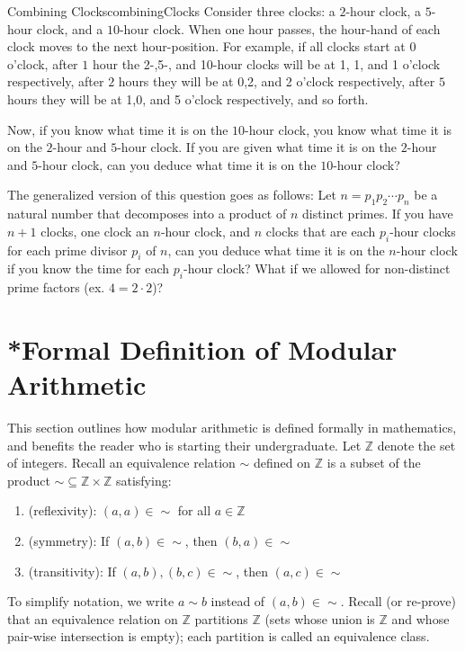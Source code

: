 \documentclass{article}
\newcommand{\Z}{\mathbb{Z}}
\newcommand{\sse}{\subseteq}
\begin{document}
\begin{exercise}{Combining Clocks}{combiningClocks}
  Consider three clocks: a $2$-hour clock, a $5$-hour clock, and a $10$-hour clock. When one hour passes, the
  hour-hand of each clock moves to the next hour-position. For example, if all clocks start at $0$ o'clock,
  after $1$ hour the 2-,5-, and 10-hour clocks will be at 1, 1, and 1 o'clock respectively, after $2$ hours they will
  be at 0,2, and 2 o'clock respectively, after $5$ hours they will be at 1,0, and 5 o'clock respectively, and so
  forth.


  Now, if you know what time it is on the $10$-hour clock, you know what time it is on the $2$-hour and
  $5$-hour clock. If you are given what time it is on the $2$-hour and $5$-hour clock, can you deduce what
  time it is on the $10$-hour clock?

  The generalized version of this question goes as follows: Let $n = p_1p_2\cdots p_n$ be a natural number
  that decomposes into a product of $n$ distinct primes. If you have $n+1$ clocks, one clock an $n$-hour
  clock, and $n$ clocks that are each $p_i$-hour clocks for each prime divisor $p_i$ of $n$, can you deduce
  what time it is on the $n$-hour clock if you know the time for each $p_i$-hour clock? What if we allowed for
  non-distinct prime factors (ex. $4= 2\cdot 2$)?
\end{exercise}

\section{*Formal Definition of Modular Arithmetic}

This section outlines how modular arithmetic is defined formally in mathematics, and benefits the reader who
is starting their undergraduate. Let $\Z$ denote the set of integers. Recall an equivalence relation $\sim$
defined on $\Z$ is a subset of the product $\sim \sse \Z\times \Z$  satisfying:

\begin{enumerate}
  \item (reflexivity): $(a,a) \in \sim$ for all $a \in \Z$
  \item (symmetry): If $(a,b) \in \sim$, then $(b,a) \in \sim$
  \item (transitivity): If $(a,b), (b,c) \in \sim$, then $(a,c) \in \sim$
\end{enumerate}

To simplify notation, we write $a\sim b$ instead of $(a,b) \in \sim$. Recall (or re-prove) that an equivalence
relation on $\Z$ partitions $\Z$ (sets whose union is $\Z$ and whose pair-wise intersection is empty); each
partition is called an equivalence class.
\end{document}
